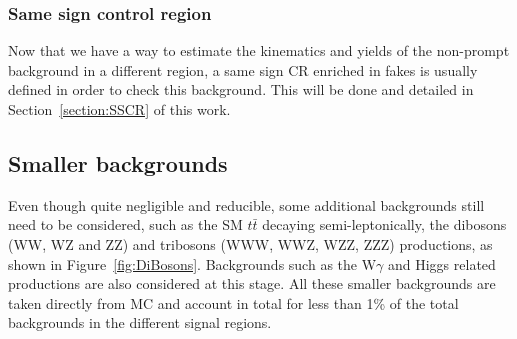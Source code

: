 \documentclass[a4paper, 10pt, openright]{report}
\begin{document}
\subsubsection*{Same sign control region}

Now that we have a way to estimate the kinematics and yields of the non-prompt background in a different region, a same sign \ac{CR} enriched in fakes is usually defined in order to check this background. This will be done and detailed in Section~\ref{section:SSCR} of this work.

%
%

\subsection{Smaller backgrounds} \label{subsection:SmallerBkg}

Even though quite negligible and reducible, some additional backgrounds still need to be considered, such as the \ac{SM} $t \bar t$ decaying semi-leptonically, the dibosons (WW, WZ and ZZ) and tribosons (WWW, WWZ, WZZ, ZZZ) productions, as shown in Figure~\ref{fig:DiBosons}. Backgrounds such as the W$\gamma$ and Higgs related productions are also considered at this stage. All these smaller backgrounds are taken directly from \ac{MC} and account in total for less than 1\% of the total backgrounds in the different signal regions. 
\end{document}
